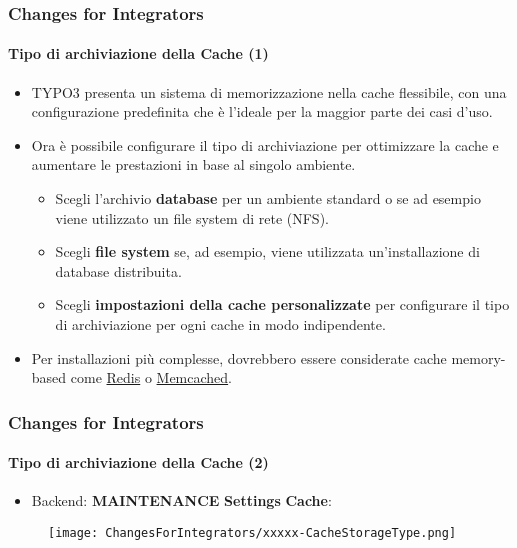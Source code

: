 \begin{frame}[fragile]
	\frametitle{Changes for Integrators}
	\framesubtitle{Tipo di archiviazione della Cache (1)}

	\begin{itemize}

		\item TYPO3 presenta un sistema di memorizzazione nella cache flessibile, con una
		    configurazione predefinita che è l'ideale per la maggior parte dei casi d'uso.
		\item Ora è possibile configurare il tipo di archiviazione per ottimizzare la cache
		    e aumentare le prestazioni in base al singolo ambiente.

			\begin{itemize}
				\item Scegli l'archivio \textbf{database} per un ambiente standard o se ad
					esempio viene utilizzato un file system di rete (NFS).
				\item Scegli \textbf{file system} se, ad esempio, viene utilizzata un'installazione
				    di database distribuita.
				\item Scegli \textbf{impostazioni della cache personalizzate} per configurare il tipo
				    di archiviazione per ogni cache in modo indipendente.
			\end{itemize}

		\item Per installazioni più complesse, dovrebbero essere considerate cache memory-based come
			\href{https://redis.io/}{Redis}
			o
			\href{https://memcached.org/}{Memcached}.

	\end{itemize}

\end{frame}


\begin{frame}[fragile]
	\frametitle{Changes for Integrators}
	\framesubtitle{Tipo di archiviazione della Cache (2)}

	\begin{itemize}

		\item Backend: \textbf{MAINTENANCE} \hspace{0.1cm}\textbf{Settings} \hspace{0.1cm}\textbf{Cache}:
		\end{itemize}

	\begin{figure}
		\texttt{[image: ChangesForIntegrators/xxxxx-CacheStorageType.png]}
	\end{figure}

\end{frame}

